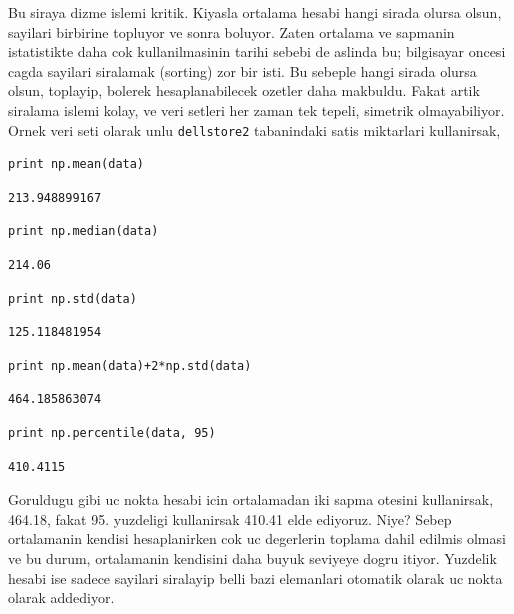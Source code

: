 \documentclass[12pt,fleqn]{article}\usepackage{../common}
\begin{document}
Bu siraya dizme islemi kritik. Kiyasla ortalama hesabi hangi sirada olursa
olsun, sayilari birbirine topluyor ve sonra boluyor. Zaten ortalama ve
sapmanin istatistikte daha cok kullanilmasinin tarihi sebebi de aslinda bu;
bilgisayar oncesi cagda sayilari siralamak (sorting) zor bir isti. Bu
sebeple hangi sirada olursa olsun, toplayip, bolerek hesaplanabilecek
ozetler daha makbuldu. Fakat artik siralama islemi kolay, ve veri setleri
her zaman tek tepeli, simetrik olmayabiliyor. Ornek veri seti olarak unlu
\verb!dellstore2! tabanindaki satis miktarlari kullanirsak,

\begin{verbatim}
print np.mean(data)
\end{verbatim}

\begin{verbatim}
213.948899167
\end{verbatim}

\begin{verbatim}
print np.median(data)
\end{verbatim}

\begin{verbatim}
214.06
\end{verbatim}

\begin{verbatim}
print np.std(data)
\end{verbatim}

\begin{verbatim}
125.118481954
\end{verbatim}

\begin{verbatim}
print np.mean(data)+2*np.std(data)
\end{verbatim}

\begin{verbatim}
464.185863074
\end{verbatim}

\begin{verbatim}
print np.percentile(data, 95)
\end{verbatim}

\begin{verbatim}
410.4115
\end{verbatim}

Goruldugu gibi uc nokta hesabi icin ortalamadan iki sapma otesini
kullanirsak, 464.18, fakat 95. yuzdeligi kullanirsak 410.41 elde
ediyoruz. Niye? Sebep ortalamanin kendisi hesaplanirken cok uc
degerlerin toplama dahil edilmis olmasi ve bu durum, ortalamanin
kendisini daha buyuk seviyeye dogru itiyor. Yuzdelik hesabi ise sadece
sayilari siralayip belli bazi elemanlari otomatik olarak uc nokta
olarak addediyor.
\end{document}
